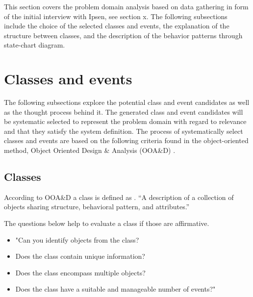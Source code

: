 This section covers the problem domain analysis based on data gathering in form of the initial interview with Ipsen, see section x.
The following subsections include the choice of the selected classes and events, the explanation of the structure between classes, and the description of the behavior patterns through state-chart diagram.

\section{Classes and events}
The following subsections explore the potential class and event candidates as well as the thought process behind it.
The generated class and event candidates will be systematic selected to represent the problem domain with regard to relevance and that they satisfy the system definition.
The process of systematically select classes and events are based on the following criteria found in the object-oriented method, Object Oriented Design \& Analysis (OOA\&D) \cite{Rod-Aalborg} .

\subsection{Classes}
According to OOA\&D a class is defined as \citep[p.~55]{Rod-Aalborg}.
“A description of a collection of objects sharing structure, behavioral pattern, and attributes.”

The questions below help to evaluate a class if those are affirmative. \citep[p.~62]{Rod-Aalborg}
\begin{itemize}
	\item "Can you identify objects from the class?
	\item Does the class contain unique information?
	\item Does the class encompass multiple objects?
	\item Does the class have a suitable and manageable number of events?"
\end{itemize}

